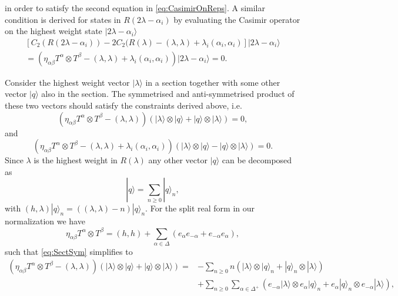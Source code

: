 in order to satisfy the second equation in \eqref{eq:CasimirOnReps}. A similar condition is derived for states in $R(2\lambda-\alpha_i)$ by evaluating the Casimir operator on the highest weight state $|2\lambda-\alpha_i\rangle$
\begin{equation}
    \begin{aligned}
        \left[C_2(R(2\lambda-\alpha_i))-2C_2(R(\lambda)-(\lambda,\lambda)+\lambda_i(\alpha_i,\alpha_i)\right]|2\lambda-\alpha_i\rangle\\
        =\left(\eta_{\alpha\beta}T^\alpha\otimes T^\beta-(\lambda,\lambda)+\lambda_i(\alpha_i,\alpha_i)\right)|2\lambda-\alpha_i\rangle =0.
    \end{aligned}
\end{equation}

Consider the highest weight vector $|\lambda\rangle$ in a section together with some other vector $|q\rangle$ also in the section. The symmetrised and anti-symmetrised product of these two vectors should satisfy the constraints derived above, i.e.\
\begin{equation}\label{eq:SectSym}
    \left(\eta_{\alpha\beta}T^\alpha\otimes T^\beta-(\lambda,\lambda)\right)\left(|\lambda\rangle\otimes|q\rangle+|q\rangle\otimes|\lambda\rangle\right)=0,
\end{equation}
and 
\begin{equation}
    \left(\eta_{\alpha\beta}T^\alpha\otimes T^\beta-(\lambda,\lambda)+\lambda_i(\alpha_i,\alpha_i)\right)\left(|\lambda\rangle\otimes|q\rangle-|q\rangle\otimes|\lambda\rangle\right)=0.
\end{equation}
Since $\lambda$ is the highest weight in $R(\lambda)$ any other vector $|q\rangle$ can be decomposed as 
\begin{equation}
    |q\rangle = \sum_{n\geq 0} |q\rangle_n,
\end{equation}
with $(h,\lambda)|q\rangle_n = ((\lambda,\lambda)-n)|q\rangle_n$. For the split real form in our normalization we have 
\begin{equation}
    \eta_{\alpha\beta}T^\alpha\otimes T^\beta = (h,h)+\sum_{\alpha\in\Delta}\left(e_\alpha e_{-\alpha}+e_{-\alpha}e_\alpha\right),
\end{equation}
such that \eqref{eq:SectSym} simplifies to 
\begin{equation}
    \begin{aligned}
    \left(\eta_{\alpha\beta}T^\alpha\otimes T^\beta-(\lambda,\lambda)\right)\left(|\lambda\rangle\otimes|q\rangle+|q\rangle\otimes|\lambda\rangle\right) =& -\sum_{n\geq 0} n\left(|\lambda\rangle\otimes|q\rangle_n+|q\rangle_n\otimes|\lambda\rangle\right)\\
    &+ \sum_{n\geq 0}\sum_{\alpha\in\Delta^+} \left(e_{-\alpha}|\lambda\rangle\otimes e_{\alpha}|q\rangle_n+e_{\alpha}|q\rangle_n\otimes e_{-\alpha}|\lambda\rangle\right),
    \end{aligned}
\end{equation}
